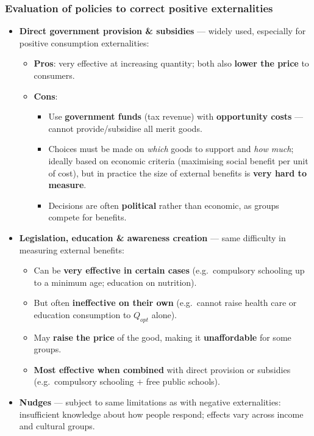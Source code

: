 \documentclass[a4paper,12pt]{article}
\begin{document}
\subsubsection*{Evaluation of policies to correct positive externalities}
\begin{itemize}
  \item \textbf{Direct government provision \& subsidies} --- widely used, especially for positive consumption externalities:
  \begin{itemize}
    \item \textbf{Pros}: very effective at increasing quantity; both also \textbf{lower the price} to consumers.
    \item \textbf{Cons}:
    \begin{itemize}
      \item Use \textbf{government funds} (tax revenue) with \textbf{opportunity costs} --- cannot provide/subsidise all merit goods.
      \item Choices must be made on \textit{which} goods to support and \textit{how much}; ideally based on economic criteria (maximising social benefit per unit of cost), but in practice the size of external benefits is \textbf{very hard to measure}.
      \item Decisions are often \textbf{political} rather than economic, as groups compete for benefits.
    \end{itemize}
  \end{itemize}
  \item \textbf{Legislation, education \& awareness creation} --- same difficulty in measuring external benefits:
  \begin{itemize}
    \item Can be \textbf{very effective in certain cases} (e.g.\ compulsory schooling up to a minimum age; education on nutrition).
    \item But often \textbf{ineffective on their own} (e.g.\ cannot raise health care or education consumption to $Q_{opt}$ alone).
    \item May \textbf{raise the price} of the good, making it \textbf{unaffordable} for some groups.
    \item \textbf{Most effective when combined} with direct provision or subsidies (e.g.\ compulsory schooling $+$ free public schools).
  \end{itemize}
  \item \textbf{Nudges} --- subject to same limitations as with negative externalities: insufficient knowledge about how people respond; effects vary across income and cultural groups.
\end{itemize}
\end{document}
